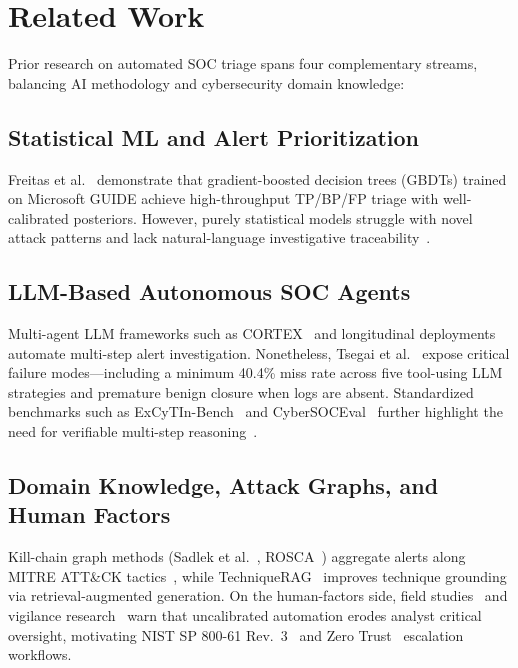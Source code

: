 \section{Related Work}

Prior research on automated SOC triage spans four complementary streams, balancing AI methodology and cybersecurity domain knowledge:

\subsection{Statistical ML and Alert Prioritization}
Freitas et al.~\cite{freitas2024,freitas2026} demonstrate that gradient-boosted decision trees (GBDTs) trained on Microsoft GUIDE achieve high-throughput TP/BP/FP triage with well-calibrated posteriors. However, purely statistical models struggle with novel attack patterns and lack natural-language investigative traceability~\cite{sommer2010}.

\subsection{LLM-Based Autonomous SOC Agents}
Multi-agent LLM frameworks such as CORTEX~\cite{wei2025} and longitudinal deployments~\cite{banstola2026} automate multi-step alert investigation. Nonetheless, Tsegai et al.~\cite{tsegai2026} expose critical failure modes—including a minimum 40.4\% miss rate across five tool-using LLM strategies and premature benign closure when logs are absent. Standardized benchmarks such as ExCyTIn-Bench~\cite{wu2026} and CyberSOCEval~\cite{deason2025} further highlight the need for verifiable multi-step reasoning~\cite{habibzadeh2025}.

\subsection{Domain Knowledge, Attack Graphs, and Human Factors}
Kill-chain graph methods (Sadlek et al.~\cite{sadlek2025}, ROSCA~\cite{garcia2025}) aggregate alerts along MITRE ATT\&CK tactics~\cite{strom2020}, while TechniqueRAG~\cite{lekssays2025} improves technique grounding via retrieval-augmented generation. On the human-factors side, field studies~\cite{alahmadi2022,kersten2025} and vigilance research~\cite{tilbury2025,tilbury2026} warn that uncalibrated automation erodes analyst critical oversight, motivating NIST SP 800-61 Rev.~3~\cite{nist2025} and Zero Trust~\cite{nist2020} escalation workflows.


